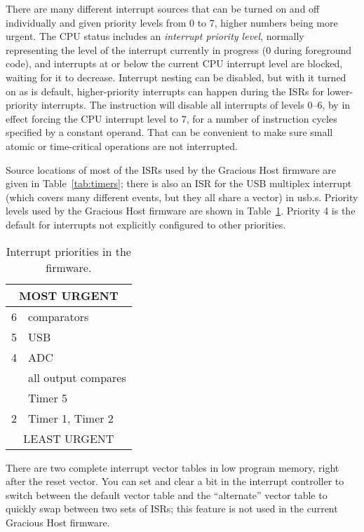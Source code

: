 There are many different interrupt sources that can be turned on and off
individually and given priority levels from 0 to 7, higher numbers being
more urgent.  The CPU status includes an \emph{interrupt priority level},
normally representing the level of the interrupt currently in progress (0
during foreground code), and interrupts at or below the current CPU
interrupt level are blocked, waiting for it to decrease.  Interrupt nesting
can be disabled, but with it turned on as is default, higher-priority
interrupts can happen during the ISRs for lower-priority interrupts.  The
 instruction will disable all interrupts of levels 0--6, by in
effect forcing the CPU interrupt level to 7, for a number of instruction
cycles specified by a constant operand.  That can be convenient to make sure
small atomic or time-critical operations are not interrupted.

Source locations of most of the ISRs used by the Gracious Host firmware are
given in Table~\ref{tab:timers}; there is also an ISR for the USB multiplex
interrupt (which covers many different events, but they all share a vector)
in usb.s.  Priority levels used by the Gracious Host firmware are shown in
Table~\ref{tab:int-priorities}.  Priority 4 is the default for interrupts
not explicitly configured to other priorities.

\begin{table}
{\centering
\begin{tabular}{cp{1.2in}}
\multicolumn{2}{c}{MOST URGENT} \\
\hline
6 & comparators \\
\hline
5 & USB \\
\hline
4 & ADC \\
  & all output compares \\
  & Timer 5 \\
\hline
2 & Timer 1, Timer 2 \\
\hline \multicolumn{2}{c}{LEAST URGENT}
\end{tabular}\par}
\caption{Interrupt priorities in the firmware.}\label{tab:int-priorities}
\end{table}

There are two complete interrupt vector tables in low program memory, right
after the reset vector.  You can set and clear a bit in the interrupt
controller to switch between the default vector table and the ``alternate''
vector table to quickly swap between two sets of ISRs; this feature is not
used in the current Gracious Host firmware.

